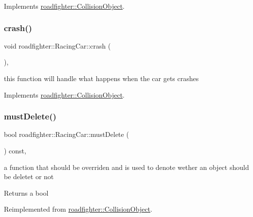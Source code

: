 Implements \hyperlink{classroadfighter_1_1CollisionObject_a7eafa2fdc4463788b816fdd9370d28d9}{roadfighter\+::\+Collision\+Object}.

\mbox{\label{classroadfighter_1_1RacingCar_a2f5018f17852d75682afd78e806b8e4c}} 
\subsubsection{\texorpdfstring{crash()}{crash()}}
{\footnotesize\ttfamily void roadfighter\+::\+Racing\+Car\+::crash (\begin{DoxyParamCaption}{ }\end{DoxyParamCaption})\hspace{0.3cm}{\ttfamily [override]}, {\ttfamily [virtual]}}

this function will handle what happens when the car gets crashes 

Implements \hyperlink{classroadfighter_1_1CollisionObject_a18f0f60a5a664d6fb554daac0d398a2c}{roadfighter\+::\+Collision\+Object}.

\mbox{\label{classroadfighter_1_1RacingCar_a300bccb330cc8e84834edd5f85354a10}} 
\subsubsection{\texorpdfstring{must\+Delete()}{mustDelete()}}
{\footnotesize\ttfamily bool roadfighter\+::\+Racing\+Car\+::must\+Delete (\begin{DoxyParamCaption}{ }\end{DoxyParamCaption}) const\hspace{0.3cm}{\ttfamily [override]}, {\ttfamily [virtual]}}

a function that should be overriden and is used to denote wether an object should be deletet or not \begin{DoxyReturn}{Returns}
a bool 
\end{DoxyReturn}


Reimplemented from \hyperlink{classroadfighter_1_1CollisionObject_a738071cd7b1b8cd4c8d455b5e552bd4c}{roadfighter\+::\+Collision\+Object}.

